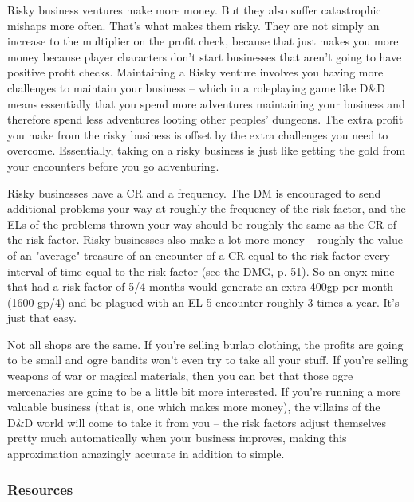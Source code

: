 Risky business ventures make more money. But they also suffer catastrophic mishaps more often. That's what makes them risky. They are not simply an increase to the multiplier on the profit check, because that just makes you more money because player characters don't start businesses that aren't going to have positive profit checks. Maintaining a Risky venture involves you having more challenges to maintain your business -- which in a roleplaying game like D\&D means essentially that you spend more adventures maintaining your business and therefore spend less adventures looting other peoples' dungeons. The extra profit you make from the risky business is offset by the extra challenges you need to overcome. Essentially, taking on a risky business is just like getting the gold from your encounters before you go adventuring.

Risky businesses have a CR and a frequency. The DM is encouraged to send additional problems your way at roughly the frequency of the risk factor, and the ELs of the problems thrown your way should be roughly the same as the CR of the risk factor. Risky businesses also make a lot more money -- roughly the value of an "average" treasure of an encounter of a CR equal to the risk factor every interval of time equal to the risk factor (see the DMG, p. 51). So an onyx mine that had a risk factor of 5/4 months would generate an extra 400gp per month (1600 gp/4) and be plagued with an EL 5 encounter roughly 3 times a year. It's just that easy.

Not all shops are the same. If you're selling burlap clothing, the profits are going to be small and ogre bandits won't even try to take all your stuff. If you're selling weapons of war or magical materials, then you can bet that those ogre mercenaries are going to be a little bit more interested. If you're running a more valuable business (that is, one which makes more money), the villains of the D\&D world will come to take it from you -- the risk factors adjust themselves pretty much automatically when your business improves, making this approximation amazingly accurate in addition to simple.

\subsubsection{Resources}

